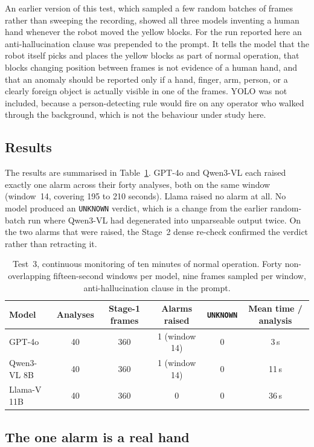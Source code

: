 \documentclass[11pt,a4paper]{article}
\begin{document}
An earlier version of this test, which sampled a few random batches of
frames rather than sweeping the recording, showed all three models
inventing a human hand whenever the robot moved the yellow blocks. For the
run reported here an anti-hallucination clause was prepended to the
prompt. It tells the model that the robot itself picks and places the
yellow blocks as part of normal operation, that blocks changing position
between frames is not evidence of a human hand, and that an anomaly should
be reported only if a hand, finger, arm, person, or a clearly foreign
object is actually visible in one of the frames. YOLO was not included,
because a person-detecting rule would fire on any operator who walked
through the background, which is not the behaviour under study here.

\subsection{Results}

The results are summarised in Table~\ref{tab:test3}. GPT-4o and Qwen3-VL
each raised exactly one alarm across their forty analyses, both on the
same window (window~14, covering 195 to 210 seconds). Llama raised no
alarm at all. No model produced an \texttt{UNKNOWN} verdict, which is a
change from the earlier random-batch run where Qwen3-VL had degenerated
into unparseable output twice. On the two alarms that were raised, the
Stage~2 dense re-check confirmed the verdict rather than retracting it.

\begin{table}[h]
\centering
\small
\setlength{\tabcolsep}{6pt}
\begin{tabular}{@{}l c c c c c@{}}
\toprule
Model & Analyses & Stage-1 frames & Alarms raised & \texttt{UNKNOWN}
      & Mean time / analysis \\
\midrule
GPT-4o      & 40 & 360 & 1 (window 14) & 0 & 3\,s \\
Qwen3-VL 8B & 40 & 360 & 1 (window 14) & 0 & 11\,s \\
Llama-V 11B & 40 & 360 & 0             & 0 & 36\,s \\
\bottomrule
\end{tabular}
\caption{Test~3, continuous monitoring of ten minutes of normal operation.
Forty non-overlapping fifteen-second windows per model, nine frames
sampled per window, anti-hallucination clause in the prompt.}
\label{tab:test3}
\end{table}
\FloatBarrier

\subsection{The one alarm is a real hand}
\end{document}
